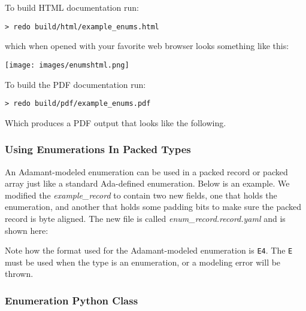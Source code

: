 To build HTML documentation run:

\vspace{5mm} %
\begin{verbatim}
> redo build/html/example_enums.html
\end{verbatim}
\vspace{5mm} %

which when opened with your favorite web browser looks something like this:

\vspace{5mm} %
\texttt{[image: images/enumshtml.png]}
\vspace{5mm} %

To build the PDF documentation run:

\vspace{5mm} %
\begin{verbatim}
> redo build/pdf/example_enums.pdf
\end{verbatim}
\vspace{5mm} %

Which produces a PDF output that looks like the following. \\

\noindent\makebox[\linewidth]{\rule{\textwidth}{0.4pt}}

\noindent\makebox[\linewidth]{\rule{\textwidth}{0.4pt}}

\subsubsection{Using Enumerations In Packed Types}

An Adamant-modeled enumeration can be used in a packed record or packed array just like a standard Ada-defined enumeration. Below is an example. We modified the \textit{example\_record} to contain two new fields, one that holds the enumeration, and another that holds some padding bits to make sure the packed record is byte aligned. The new file is called \textit{enum\_record.record.yaml} and is shown here:


Note how the format used for the Adamant-modeled enumeration is \texttt{E4}. The \texttt{E} must be used when the type is an enumeration, or a modeling error will be thrown.

\subsubsection{Enumeration Python Class}

